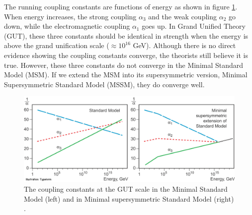 \documentclass[12pt]{report}
\begin{document}

The running coupling constants are functions of energy as shown in figure \ref{fig: running_coupling_constant}.
When energy increases, the strong coupling $\alpha_{3}$ and the weak coupling $\alpha_{2}$ go down, while the electromagnetic coupling $\alpha_{1}$ goes up.
In Grand Unified Theory (GUT), these three constants should be identical in strength when the energy is above the grand unification scale ($\approx 10^{16}$ GeV).
Although there is no direct evidence showing the coupling constants converge, the theorists still believe it is true.
However, these three constants do not converge in the Minimal Standard Model (MSM). 
If we extend the MSM into its supersymmetric version, Minimal Supersymmetric Standard Model (MSSM), they do converge well.
\begin{figure}[htbp]
\begin{center}
\includegraphics[scale=0.75]{figures/phypub4highen.pdf}
\caption{The coupling constants at the GUT scale in the Minimal Standard Model (left) and in Minimal supersymmetric Standard Model (right) \cite{running_coupling_constants}.}
\label{fig: running_coupling_constant}
\end{center}
\end{figure}
\end{document}
